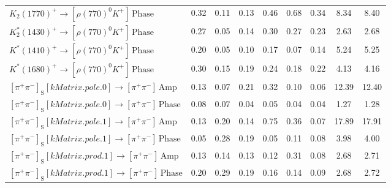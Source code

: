 \begin{tabular}{l  c  c  c  c  c  c  c  | c }
$K_{2}(1770)^{+}\rightarrow \left[\rho(770)^{0}K^{+}\right]\,\text{Phase}$ & 0.32 & 0.11 & 0.13 & 0.46 & 0.68 & 0.34 & 8.34 & 8.40 \\ 
$K_{2}^{*}(1430)^{+}\rightarrow \left[\rho(770)^{0}K^{+}\right]\,\text{Phase}$ & 0.27 & 0.05 & 0.14 & 0.30 & 0.27 & 0.23 & 2.63 & 2.68 \\ 
$K^{*}(1410)^{+}\rightarrow \left[\rho(770)^{0}K^{+}\right]\,\text{Phase}$ & 0.20 & 0.05 & 0.10 & 0.17 & 0.07 & 0.14 & 5.24 & 5.25 \\ 
$K^{*}(1680)^{+}\rightarrow \left[\rho(770)^{0}K^{+}\right]\,\text{Phase}$ & 0.30 & 0.15 & 0.19 & 0.24 & 0.18 & 0.22 & 4.13 & 4.16 \\ 
$\left[\pi^{+}\pi^{-}\right]_{\text{S}}\left[kMatrix.pole.0\right]\rightarrow \left[\pi^{+}\pi^{-}\right]\,\text{Amp}$ & 0.13 & 0.07 & 0.21 & 0.32 & 0.10 & 0.06 & 12.39 & 12.40 \\ 
$\left[\pi^{+}\pi^{-}\right]_{\text{S}}\left[kMatrix.pole.0\right]\rightarrow \left[\pi^{+}\pi^{-}\right]\,\text{Phase}$ & 0.08 & 0.07 & 0.04 & 0.05 & 0.04 & 0.04 & 1.27 & 1.28 \\ 
$\left[\pi^{+}\pi^{-}\right]_{\text{S}}\left[kMatrix.pole.1\right]\rightarrow \left[\pi^{+}\pi^{-}\right]\,\text{Amp}$ & 0.13 & 0.20 & 0.14 & 0.75 & 0.36 & 0.07 & 17.89 & 17.91 \\ 
$\left[\pi^{+}\pi^{-}\right]_{\text{S}}\left[kMatrix.pole.1\right]\rightarrow \left[\pi^{+}\pi^{-}\right]\,\text{Phase}$ & 0.05 & 0.28 & 0.19 & 0.05 & 0.11 & 0.08 & 3.98 & 4.00 \\ 
$\left[\pi^{+}\pi^{-}\right]_{\text{S}}\left[kMatrix.prod.1\right]\rightarrow \left[\pi^{+}\pi^{-}\right]\,\text{Amp}$ & 0.13 & 0.14 & 0.13 & 0.12 & 0.31 & 0.08 & 2.68 & 2.71 \\ 
$\left[\pi^{+}\pi^{-}\right]_{\text{S}}\left[kMatrix.prod.1\right]\rightarrow \left[\pi^{+}\pi^{-}\right]\,\text{Phase}$ & 0.20 & 0.29 & 0.19 & 0.16 & 0.14 & 0.09 & 2.68 & 2.72 \\ 
\hline
\hline
\end{tabular}
